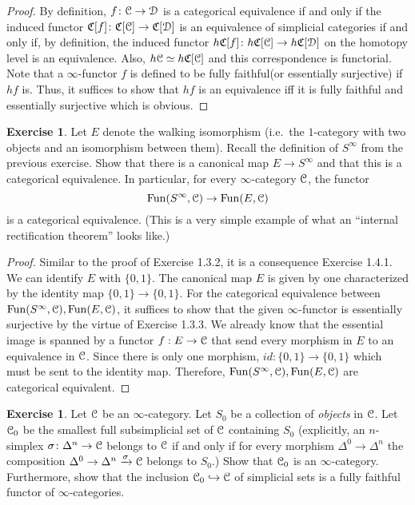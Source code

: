 \documentclass[10pt,a4paper,reqno,oneside]{book} %
\theoremstyle{plain}
\theoremstyle{definition}
\newtheorem{exercise}[thm]{Exercise}
\theoremstyle{remark}
\numberwithin{equation}{section}
\begin{document}
\begin{proof}
    By definition, $f \colon \mathcal C \to \mathcal D$ is a categorical equivalence if and only if the induced functor $\mathfrak C[f] \colon \mathfrak C[\mathcal C] \to \mathfrak C[\mathcal D]$ is an equivalence of simplicial categories if and only if, by definition, the induced functor $h\mathfrak C[f] \colon h\mathfrak C[\mathcal C] \to h\mathfrak C[\mathcal D]$ on the homotopy level is an equivalence. Also, $h\mathcal C \simeq h\mathfrak C[\mathcal C]$ and this correspondence is functorial. Note that a $\infty$-functor $f$ is defined to be fully faithful(or essentially surjective) if $hf$ is. Thus, it suffices to show that $hf$ is an equivalence iff it is fully faithful and essentially surjective which is obvious.
\end{proof}

\begin{exercise}
	Let $E$ denote the walking isomorphism (i.e.\ the $1$-category with two objects and an isomorphism between them).
	Recall the definition of $S^\infty$ from the previous exercise.
	Show that there is a canonical map $E \to S^\infty$ and that this is a categorical equivalence.
	In particular, for every $\infty$-category $\mathcal C$, the functor
	\[ \operatorname{Fun}(S^\infty, \mathcal C) \to \operatorname{Fun}(E, \mathcal C) \]
	is a categorical equivalence.
	(This is a very simple example of what an ``internal rectification theorem'' looks like.)
\end{exercise}

\begin{proof}
    Similar to the proof of Exercise 1.3.2, it is a consequence Exercise 1.4.1. We can identify $E$ with $\{0,1\}$. The canonical map $E$ is given by one characterized by the identity map $\{0,1\} \to \{0,1\}$. 
    For the categorical equivalence between $\operatorname{Fun}(S^\infty, \mathcal C), \operatorname{Fun}(E, \mathcal C)$, it suffices to show that the given $\infty$-functor is essentially surjective by the virtue of Exercise 1.3.3. We already know that the essential image is spanned by a functor $f:E \to \mathcal C$ that send every morphism in $E$ to an equivalence in $\mathcal C$. Since there is only one morphism, $id:\{0,1\} \to \{0,1\}$ which must be sent to the identity map. Therefore, $\operatorname{Fun}(S^\infty, \mathcal C), \operatorname{Fun}(E, \mathcal C)$ are categorical equivalent.
\end{proof}

\begin{exercise}
	Let $\mathcal C$ be an $\infty$-category.
	Let $S_0$ be a collection of \emph{objects} in $\mathcal C$.
	Let $\mathcal C_0$ be the smallest full subsimplicial set of $\mathcal C$ containing $S_0$ (explicitly, an $n$-simplex $\sigma \colon \Delta^n \to \mathcal C$ belongs to $\mathcal C$ if and only if for every morphism $\Delta^0 \to \Delta^n$ the composition $\Delta^0 \to \Delta^n \xrightarrow{\sigma} \mathcal C$ belongs to $S_0$.)
	Show that $\mathcal C_0$ is an $\infty$-category.
	Furthermore, show that the inclusion $\mathcal C_0 \hookrightarrow \mathcal C$ of simplicial sets is a fully faithful functor of $\infty$-categories.
\end{exercise}
\end{document}
